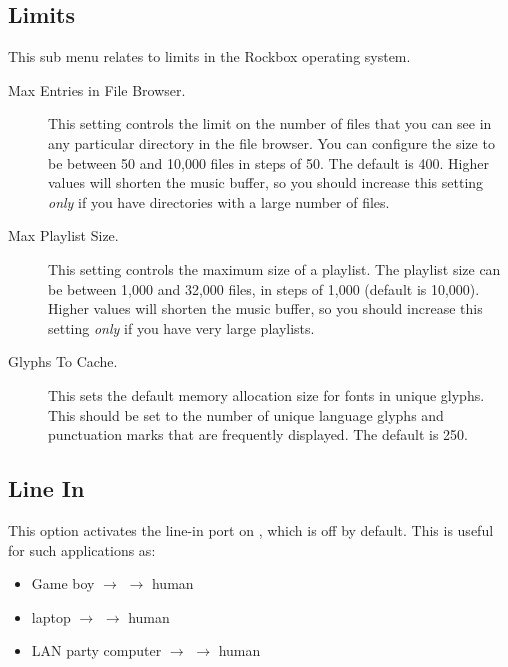 \subsection{Limits}
This sub menu relates to limits in the Rockbox operating system.
  \begin{description}
    \item [Max Entries in File Browser.] This setting controls the limit on
    the number of files that you can see in any particular directory in the
    file browser. You can configure the size to be between 50 and
    10,000 files in steps of 50. The default is 400. Higher values will shorten
    the music buffer, so you should increase this setting \emph{only} if you have
    directories with a large number of files.

    \item [Max Playlist Size.] This setting controls the maximum size of
    a playlist. The playlist size can be between 1,000 and 32,000 files,
    in steps of 1,000 (default is 10,000). Higher values will shorten the
    music buffer, so you should increase this setting \emph{only} if you
    have very large playlists.

    \item [Glyphs To Cache.] This sets the default memory allocation size
    for fonts in unique glyphs. This should be set to the number of unique
    language glyphs and punctuation marks that are frequently displayed.
    The default is 250.
  \end{description}
  {
    \subsection{Line In} This option activates the line-in port on \dap, which is
      off by default. This is useful for such applications as:
      \begin{itemize}
      \item Game boy $\rightarrow$ \dap $\rightarrow$ human
      \item laptop $\rightarrow$ \dap $\rightarrow$ human
      \item LAN party computer $\rightarrow$ \dap $\rightarrow$ human
      \end{itemize}
  }
